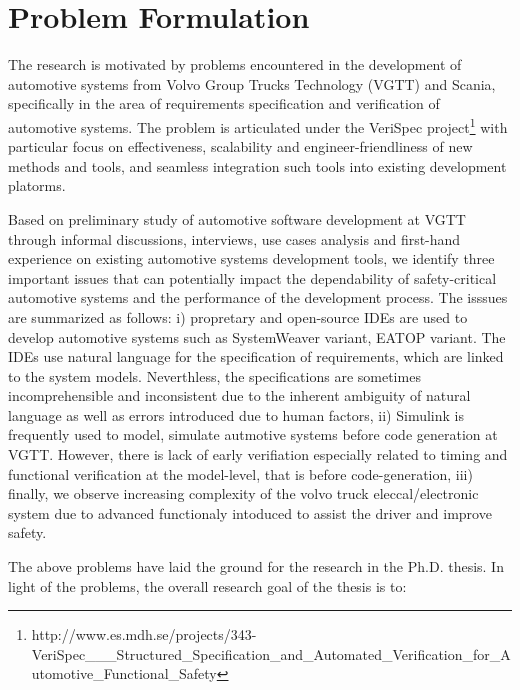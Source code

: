 \chapter{Problem Formulation}
The research is motivated by problems encountered in the development of automotive systems from Volvo Group Trucks Technology (VGTT) and Scania, specifically in the area of requirements specification and verification of automotive systems. The problem is articulated under the VeriSpec project\footnote{http://www.es.mdh.se/projects/343-VeriSpec\_\_\_Structured\_Specification\_and\_Automated\_Verification\_for\_Automotive\_Functional\_Safety} with particular focus on effectiveness, scalability and engineer-friendliness of new methods and tools, and seamless integration such tools into existing development platorms.

Based on preliminary study of automotive software development at VGTT through informal discussions, interviews, use cases analysis and first-hand experience on existing automotive systems development tools, we identify three important issues that can potentially impact the dependability of safety-critical automotive systems and the performance of the development process. The isssues are  summarized as follows: i) propretary and open-source IDEs are used to develop automotive systems such as SystemWeaver variant, EATOP variant. The IDEs use natural language for the specification of requirements, which are linked to the system models. Neverthless, the specifications are sometimes incomprehensible and inconsistent due to the inherent ambiguity of natural language as well as errors introduced due to human factors,  ii) Simulink is frequently used to model, simulate autmotive systems before code generation at VGTT. However, there is lack of early verifiation especially related to timing and functional verification at the model-level, that is before code-generation, iii) finally, we observe increasing complexity of the volvo truck eleccal/electronic system due to advanced functionaly intoduced to assist the driver and improve safety.

The above problems have laid the ground for the research in the Ph.D. thesis. In light of the problems, the overall research goal of the thesis is to:
\begin{center}
\end{center}

